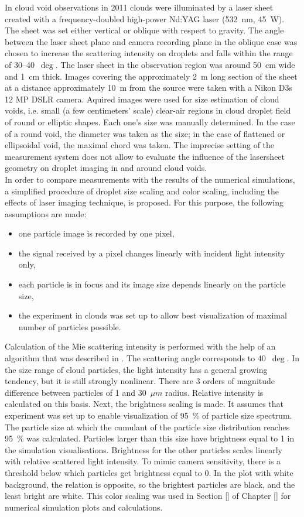 \documentclass[../main.tex]{subfiles}
\begin{document}
In cloud void observations in 2011 clouds were illuminated by a laser sheet created with a frequency-doubled high-power Nd:YAG laser (532~nm, 45~W). The sheet was set either vertical or oblique with respect to gravity. The angle between the laser sheet plane and camera recording plane in the oblique case was chosen to increase the scattering intensity on droplets and falls within the range of 30–40~$\deg$. The laser sheet in the observation region was around 50~cm wide and 1~cm thick. Images covering the approximately 2~m long section of the sheet at a distance approximately 10~m from the source were taken with a Nikon D3s 12 MP DSLR camera. Aquired images were used for size estimation of cloud voids, i.e. small (a few centimeters’ scale) clear-air regions in cloud droplet field of round or elliptic shapes. Each one’s size was manually determined. In the case of a round void, the diameter was taken as the size; in the case of flattened or ellipsoidal void, the maximal chord was taken. The imprecise setting of the measurement system does not allow to evaluate the influence of the lasersheet geometry on droplet imaging in and around cloud voids.  \\
In order to compare measurements with the results of the numerical simulations, a simplified procedure of droplet size scaling and color scaling, including the effects of laser imaging technique, is proposed. For this purpose, the following assumptions are made:
\begin{itemize}
\item one particle image is recorded by one pixel,
\item the signal received by a pixel changes linearly with incident light intensity only,
\item each particle is in focus and its image size depends linearly on the particle size,
\item the experiment in clouds was set up to allow best visualization of maximal number of particles possible.
\end{itemize}
Calculation of the Mie scattering intensity is performed with the help of an algorithm that was described in \citep{Bohren2007}. The scattering angle corresponds to 40~$\deg$. In the size range of cloud particles, the light intensity has a general growing tendency, but it is still strongly nonlinear. There are 3 orders of magnitude difference between particles of 1 and 30~$\mu m$ radius. Relative intensity is calculated on this basis. Next, the brightness scaling is made. It assumes that experiment was set up to enable visualization of 95~\% of particle size spectrum. The particle size at which the cumulant of the particle size distribution reaches 95~\% was calculated. Particles larger than this size have brightness equal to 1 in the simulation visualisations. Brightness for the other particles scales linearly with relative scattered light intensity. To mimic camera sensitivity, there is a threshold below which particles get brightness equal to 0. In the plot with white background, the relation is opposite, so the brightest particles are black, and the least bright are white. This color scaling was used in Section \ref{} of Chapter \ref{} for numerical simulation plots and calculations.\\
\end{document}
